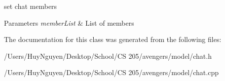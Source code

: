 set chat members 


\begin{DoxyParams}{Parameters}
{\em member\+List} & List of members \\
\hline
\end{DoxyParams}


The documentation for this class was generated from the following files\+:\begin{DoxyCompactItemize}
\item 
/\+Users/\+Huy\+Nguyen/\+Desktop/\+School/\+C\+S 205/avengers/model/chat.\+h\item 
/\+Users/\+Huy\+Nguyen/\+Desktop/\+School/\+C\+S 205/avengers/model/chat.\+cpp\end{DoxyCompactItemize}
